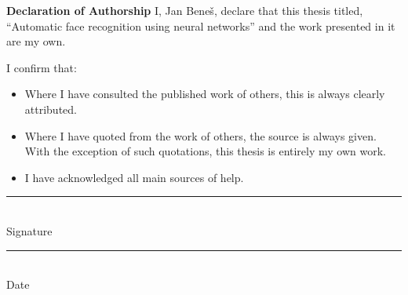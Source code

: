 \vspace*{20pt}
\noindent
{\LARGE
\textbf{Declaration of Authorship}
}
\vspace*{0.5em}
\newline
I, Jan Beneš, declare that this thesis titled, “Automatic face recognition using neural networks” and the work
presented in it are my own.

\vspace*{0.5em}
\noindent
I confirm that:
\begin{itemize}
    \item Where I have consulted the published work of others, this is always clearly attributed.
    \item Where I have quoted from the work of others, the source is always given.
    With the exception of such quotations, this thesis is entirely my own work.
    \item I have acknowledged all main sources of help.
\end{itemize}

\vspace*{3em}

\parbox{2in}{{\color{gray}\rule{2in}{1pt}}\\%
Signature\\}\hfill\parbox{2in}%
{{\color{gray}\rule{1in}{1pt}}\\%
Date\\\mbox{}}